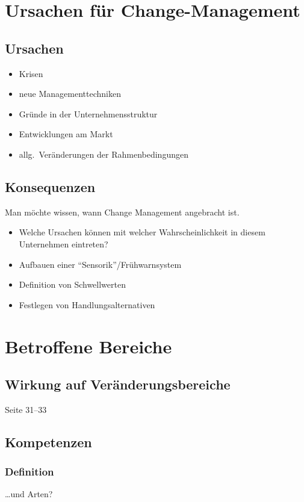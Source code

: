 \documentclass[a4paper, 12pt]{article}
\begin{document}
\section[Ursachen]{Ursachen für Change-Management}


\subsection{Ursachen}
\begin{itemize}
  \item Krisen
  \item neue Managementtechniken
  \item Gründe in der Unternehmensstruktur
  \item Entwicklungen am Markt
  \item allg.\ Veränderungen der Rahmenbedingungen
\end{itemize}


\subsection{Konsequenzen}
Man möchte wissen, wann Change Management angebracht ist.
\begin{itemize}
  \item Welche Ursachen können mit welcher Wahrscheinlichkeit in diesem Unternehmen eintreten?
  \item Aufbauen einer ``Sensorik''/Frühwarnsystem
  \item Definition von Schwellwerten
  \item Festlegen von Handlungsalternativen
\end{itemize}



\section{Betroffene Bereiche}


\subsection{Wirkung auf Veränderungsbereiche}
Seite 31--33


\subsection{Kompetenzen}

\subsubsection*{Definition}
\ldots und Arten?
\end{document}
